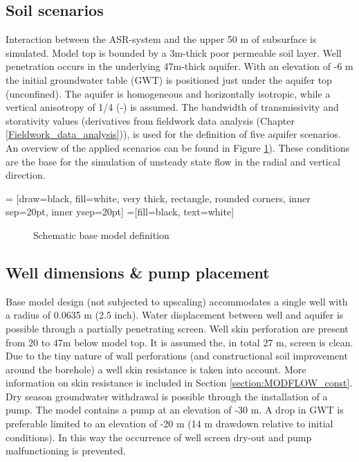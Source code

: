 \subsection{Soil scenarios} 
Interaction between the ASR-system and the upper 50 m of subsurface is simulated. Model top is bounded by a 3m-thick poor permeable soil layer. Well penetration occurs in the underlying 47m-thick aquifer. With an elevation of -6 m the initial groundwater table (GWT) is positioned just under the aquifer top (unconfined). The aquifer is homogeneous and horizontally isotropic, while a vertical anisotropy of 1/4 (-) is assumed. The bandwidth of transmissivity and storativity values (derivatives from fieldwork data analysis (Chapter \ref{Fieldwork_data_analysis})), is used for the definition of five aquifer scenarios. An overview of the applied scenarios can be found in Figure \ref{fig:Schematic_base_model}).  These conditions are the base for the simulation of unsteady state flow in the radial and vertical direction.

 = [draw=black, fill=white, very thick,
    rectangle, rounded corners, inner sep=20pt, inner ysep=20pt]
 =[fill=black, text=white]

\begin{figure}[h]
\centering
{}
\captionsetup{justification=centering}
\caption{Schematic base model definition}
\label{fig:Schematic_base_model}
\end{figure}

\subsection{Well dimensions \& pump placement}
Base model design (not subjected to upscaling) accommodates a single well with a radius of 0.0635 m (2.5 inch). Water displacement between well and aquifer is possible through a partially penetrating screen. Well skin perforation are present from 20 to 47m below model top. It is assumed the, in total 27 m, screen is clean. Due to the tiny nature of wall perforations (and constructional soil improvement around the borehole) a well skin resistance is taken into account. More information on skin resistance is included in Section \ref{section:MODFLOW_const}. Dry season groundwater withdrawal is possible through the installation of a pump. The model contains a pump at an elevation of -30 m. A drop in GWT is preferable limited to an elevation of -20 m (14 m drawdown relative to initial conditions). In this way the occurrence of well screen dry-out and pump malfunctioning is prevented.

